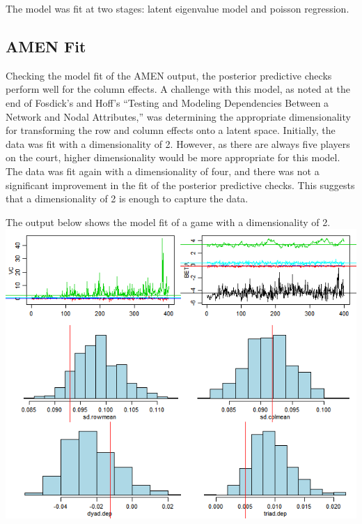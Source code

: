 \documentclass[12pt,twoside]{dukestatscithesis}
\theoremstyle{definition}
\theoremstyle{definition}
\theoremstyle{definition}
\theoremstyle{remark}
\begin{document}
The model was fit at two stages: latent eigenvalue model and poisson
regression.

\subsection{AMEN Fit}\label{amen-fit}

Checking the model fit of the AMEN output, the posterior predictive
checks perform well for the column effects. A challenge with this model,
as noted at the end of Fosdick's and Hoff's ``Testing and Modeling
Dependencies Between a Network and Nodal Attributes,'' was determining
the appropriate dimensionality for transforming the row and column
effects onto a latent space. Initially, the data was fit with a
dimensionality of 2. However, as there are always five players on the
court, higher dimensionality would be more appropriate for this model.
The data was fit again with a dimensionality of four, and there was not
a significant improvement in the fit of the posterior predictive checks.
This suggests that a dimensionality of 2 is enough to capture the data.

The output below shows the model fit of a game with a dimensionality of
2. \includegraphics{img/amenoutput.png}
\end{document}

